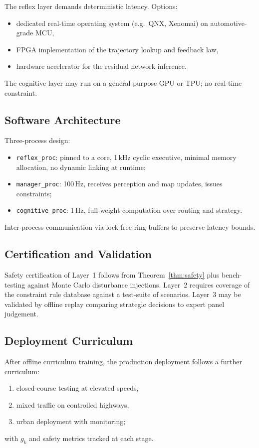 \documentclass[11pt,twocolumn]{article}
\theoremstyle{definition}
\theoremstyle{remark}
\begin{document}
The reflex layer demands deterministic latency. Options:
\begin{itemize}[leftmargin=*,itemsep=2pt]
\item dedicated real-time operating system (e.g.\ QNX, Xenomai) on automotive-grade MCU,
\item FPGA implementation of the trajectory lookup and feedback law,
\item hardware accelerator for the residual network inference.
\end{itemize}

The cognitive layer may run on a general-purpose GPU or TPU; no real-time constraint.

\subsection{Software Architecture}

Three-process design:
\begin{itemize}[leftmargin=*,itemsep=2pt]
\item \texttt{reflex\_proc}: pinned to a core, 1\,kHz cyclic executive, minimal memory allocation, no dynamic linking at runtime;
\item \texttt{manager\_proc}: 100\,Hz, receives perception and map updates, issues constraints;
\item \texttt{cognitive\_proc}: 1\,Hz, full-weight computation over routing and strategy.
\end{itemize}

Inter-process communication via lock-free ring buffers to preserve latency bounds.

\subsection{Certification and Validation}

Safety certification of Layer~1 follows from Theorem~\ref{thm:safety} plus bench-testing against Monte Carlo disturbance injections. Layer~2 requires coverage of the constraint rule database against a test-suite of scenarios. Layer~3 may be validated by offline replay comparing strategic decisions to expert panel judgement.

\subsection{Deployment Curriculum}

After offline curriculum training, the production deployment follows a further curriculum:
\begin{enumerate}[leftmargin=*,itemsep=2pt]
\item closed-course testing at elevated speeds,
\item mixed traffic on controlled highways,
\item urban deployment with monitoring;
\end{enumerate}
with $g_k$ and safety metrics tracked at each stage.
\end{document}
